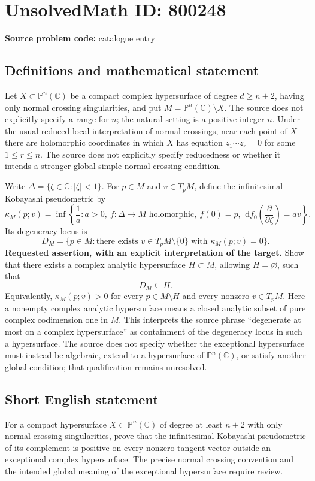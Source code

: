\documentclass[11pt]{article}
\newcommand{\C}{\mathbb{C}}
\newcommand{\PP}{\mathbb{P}}
\newcommand{\dd}{\,\mathrm{d}}
\begin{document}
\section*{UnsolvedMath ID: 800248}
\textbf{Source problem code:} catalogue entry
\subsection{Definitions and mathematical statement}
Let \(X\subset\PP^n(\C)\) be a compact complex hypersurface of degree \(d\ge n+2\), having only normal crossing singularities, and put \(M=\PP^n(\C)\setminus X\). The source does not explicitly specify a range for \(n\); the natural setting is a positive integer \(n\). Under the usual reduced local interpretation of normal crossings, near each point of \(X\) there are holomorphic coordinates in which \(X\) has equation \(z_1\cdots z_r=0\) for some \(1\le r\le n\). The source does not explicitly specify reducedness or whether it intends a stronger global simple normal crossing condition.

Write \(\Delta=\{\zeta\in\C:|\zeta|<1\}\). For \(p\in M\) and \(v\in T_pM\), define the infinitesimal Kobayashi pseudometric by
\[
\kappa_M(p;v)=\inf\left\{\frac{1}{a}:a>0,\ f:\Delta\to M\text{ holomorphic},\ f(0)=p,\ \dd f_0\!\left(\frac{\partial}{\partial\zeta}\right)=av\right\}.
\]
Its degeneracy locus is
\[
D_M=\{p\in M:\text{there exists }v\in T_pM\setminus\{0\}\text{ with }\kappa_M(p;v)=0\}.
\]
\textbf{Requested assertion, with an explicit interpretation of the target.} Show that there exists a complex analytic hypersurface \(H\subset M\), allowing \(H=\varnothing\), such that
\[
D_M\subseteq H.
\]
Equivalently, \(\kappa_M(p;v)>0\) for every \(p\in M\setminus H\) and every nonzero \(v\in T_pM\). Here a nonempty complex analytic hypersurface means a closed analytic subset of pure complex codimension one in \(M\). This interprets the source phrase ``degenerate at most on a complex hypersurface'' as containment of the degeneracy locus in such a hypersurface. The source does not specify whether the exceptional hypersurface must instead be algebraic, extend to a hypersurface of \(\PP^n(\C)\), or satisfy another global condition; that qualification remains unresolved.
\subsection{Short English statement}
For a compact hypersurface \(X\subset\PP^n(\C)\) of degree at least \(n+2\) with only normal crossing singularities, prove that the infinitesimal Kobayashi pseudometric of its complement is positive on every nonzero tangent vector outside an exceptional complex hypersurface. The precise normal crossing convention and the intended global meaning of the exceptional hypersurface require review.
\end{document}
